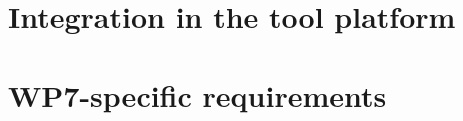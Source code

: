 \documentclass{template/openetcs_report}
\begin{document}
\chapter{Integration in the tool platform}
\label{chap:integration}






\appendix





\chapter{WP7-specific requirements}
\label{app:WP7Req}


\end{document}
